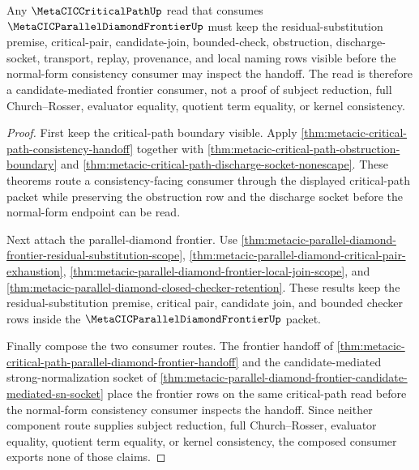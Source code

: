 \begin{theorem}
\label{thm:metacic-critical-path-diamond-frontier-consumer}
Any $\MetaCICCriticalPathUp$ read that consumes
$\MetaCICParallelDiamondFrontierUp$ must keep the residual-substitution
premise, critical-pair, candidate-join, bounded-check, obstruction,
discharge-socket, transport, replay, provenance, and local naming rows
visible before the normal-form consistency consumer may inspect the
handoff. The read is therefore a candidate-mediated frontier consumer,
not a proof of subject reduction, full Church--Rosser, evaluator
equality, quotient term equality, or kernel consistency.
\end{theorem}
\begin{proof}
First keep the critical-path boundary visible. Apply
\autoref{thm:metacic-critical-path-consistency-handoff} together with
\autoref{thm:metacic-critical-path-obstruction-boundary} and
\autoref{thm:metacic-critical-path-discharge-socket-nonescape}. These
theorems route a consistency-facing consumer through the displayed
critical-path packet while preserving the obstruction row and the
discharge socket before the normal-form endpoint can be read.

Next attach the parallel-diamond frontier. Use
\autoref{thm:metacic-parallel-diamond-frontier-residual-substitution-scope},
\autoref{thm:metacic-parallel-diamond-critical-pair-exhaustion},
\autoref{thm:metacic-parallel-diamond-frontier-local-join-scope}, and
\autoref{thm:metacic-parallel-diamond-closed-checker-retention}. These
results keep the residual-substitution premise, critical pair,
candidate join, and bounded checker rows inside the
$\MetaCICParallelDiamondFrontierUp$ packet.

Finally compose the two consumer routes. The frontier handoff of
\autoref{thm:metacic-critical-path-parallel-diamond-frontier-handoff}
and the candidate-mediated strong-normalization socket of
\autoref{thm:metacic-parallel-diamond-frontier-candidate-mediated-sn-socket}
place the frontier rows on the same critical-path read before the
normal-form consistency consumer inspects the handoff. Since neither
component route supplies subject reduction, full Church--Rosser,
evaluator equality, quotient term equality, or kernel consistency, the
composed consumer exports none of those claims.
\end{proof}

